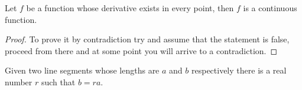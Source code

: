 \begin{theorem}
    Let $f$ be a function whose derivative exists in every point, then $f$
    is a continuous function.
\end{theorem}

\begin{proof}
    To prove it by contradiction try and assume that the statement is false,
    proceed from there and at some point you will arrive to a contradiction.
\end{proof}

\begin{lemma}
    Given two line segments whose lengths are $a$ and $b$ respectively there
    is a real number $r$ such that $b=ra$.
\end{lemma}